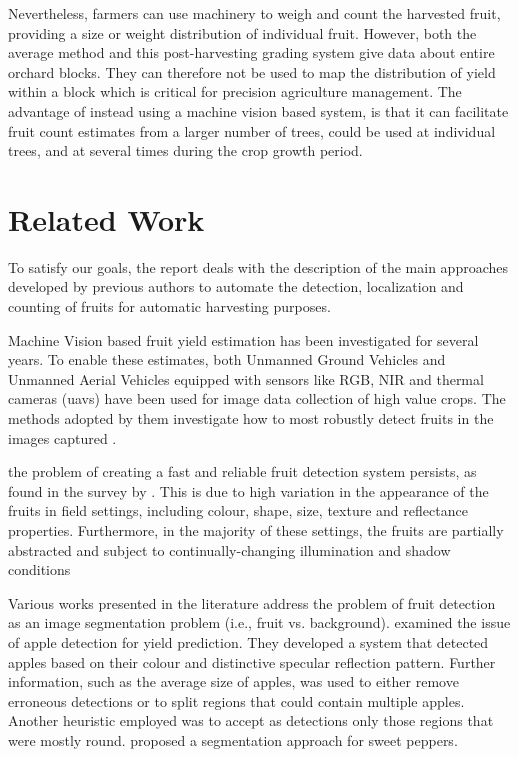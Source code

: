\documentclass[12pt]{article}
\begin{document}
Nevertheless, farmers can use machinery to weigh and count the harvested fruit,
providing a size or weight distribution of individual fruit. However, both the
average method and this post-harvesting grading system give data about entire
orchard blocks. They can therefore not be used to map the distribution of yield
within a block which is critical for precision agriculture management.
The advantage of instead using a machine vision based system, is that it can facilitate fruit count estimates from a larger number of trees, could be used at individual trees, and at several times during the crop growth period.


\section{Related Work}
To satisfy our goals, the report deals
with the description of the main approaches developed by previous authors to automate the detection, localization and counting of fruits for automatic harvesting purposes.

Machine Vision based fruit yield estimation has been investigated for several years. To enable these estimates, both Unmanned Ground Vehicles and Unmanned Aerial Vehicles equipped with sensors like RGB, NIR and thermal cameras (uavs) have been used for image data collection of high value crops\cite{7294123}. The methods adopted by them investigate how to most robustly detect fruits in the images captured \cite{article_Stajnko} \cite{article_Linker}\cite{6697125}\cite{4781575}. 


the problem of creating a fast and reliable fruit detection system persists, as found in the survey by \cite{Kapach2012ComputerVF}. This is due to high variation in the appearance of the fruits in field settings, including colour, shape, size, texture and reflectance properties. Furthermore, in the majority of these settings, the fruits are partially abstracted and subject to continually-changing illumination and shadow conditions \cite{sa2016deepfruits}


Various works presented in the literature address the problem of fruit detection as an image segmentation problem (i.e., fruit vs. background). \cite{inproceedings_wang} examined the issue of apple detection for yield prediction. They developed a system that detected apples based on their colour and distinctive specular reflection pattern. Further information, such as the average size of apples, was used to either remove erroneous detections or to split regions that could contain multiple apples. Another heuristic employed was to accept as detections only those regions that were mostly round. \cite{bac2013robust} proposed a segmentation approach for sweet peppers.
\end{document}
